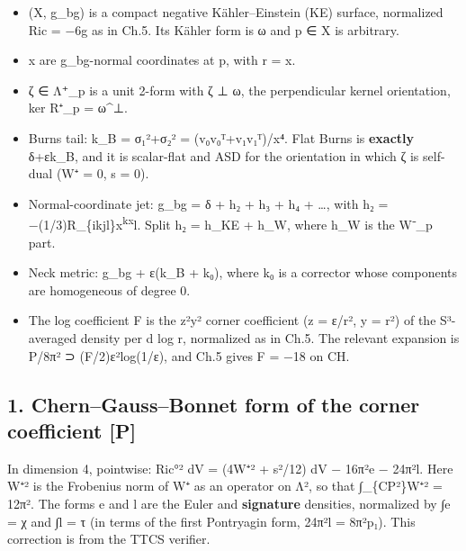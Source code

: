 \documentclass[
  10pt,
]{report}
\providecommand{\tightlist}{%
  \setlength{\itemsep}{0pt}\setlength{\parskip}{0pt}}
\begin{document}
\begin{itemize}
\tightlist
\item
  (X, g\_bg) is a compact negative Kähler--Einstein (KE) surface,
  normalized Ric = −6g as in Ch.5. Its Kähler form is ω and p ∈ X is
  arbitrary.
\item
  x are g\_bg-normal coordinates at p, with r = \textbar x\textbar.
\item
  ζ ∈ Λ⁺\_p is a unit 2-form with ζ ⊥ ω, the perpendicular kernel
  orientation, ker R⁺\_p = ω\^{}⊥.
\item
  Burns tail: k\_B = σ₁²+σ₂² = (v₀v₀ᵀ+v₁v₁ᵀ)/\textbar x\textbar⁴. Flat
  Burns is \textbf{exactly} δ+εk\_B, and it is scalar-flat and ASD for
  the orientation in which ζ is self-dual (W⁺ = 0, s = 0).
\item
  Normal-coordinate jet: g\_bg = δ + h₂ + h₃ + h₄ + \ldots, with h₂ =
  −(1/3)R\_\{ikjl\}x\textsuperscript{kx}l. Split h₂ = h\_KE + h\_W,
  where h\_W is the W⁻\_p part.
\item
  Neck metric: g\_bg + ε(k\_B + k₀), where k₀ is a corrector whose
  components are homogeneous of degree 0.
\item
  The log coefficient F is the z²y² corner coefficient (z = ε/r², y =
  r²) of the S³-averaged density per d log r, normalized as in Ch.5. The
  relevant expansion is P/8π² ⊃ (F/2)ε²log(1/ε), and Ch.5 gives F = −18
  on CH.
\end{itemize}

\hypertarget{cherngaussbonnet-form-of-the-corner-coefficient-p}{%
\subsection{1. Chern--Gauss--Bonnet form of the corner coefficient
{[}P{]}}\label{cherngaussbonnet-form-of-the-corner-coefficient-p}}

In dimension 4, pointwise: \textbar Ric°\textbar² dV =
(4\textbar W⁺\textbar² + s²/12) dV − 16π²e − 24π²l. Here
\textbar W⁺\textbar² is the Frobenius norm of W⁺ as an operator on Λ²,
so that ∫\_\{CP²\}\textbar W⁺\textbar² = 12π². The forms e and l are the
Euler and \textbf{signature} densities, normalized by ∫e = χ and ∫l = τ
(in terms of the first Pontryagin form, 24π²l = 8π²p₁). This correction
is from the TTCS verifier.
\end{document}
